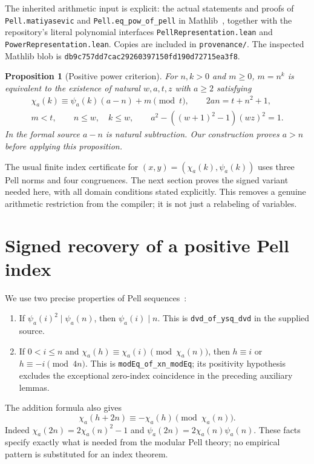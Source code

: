 \documentclass[11pt]{article}
\newtheorem{proposition}[theorem]{Proposition}
\theoremstyle{definition}
\theoremstyle{remark}
\newcommand{\File}[1]{\nolinkurl{#1}}
\begin{document}
The inherited arithmetic input is explicit: the actual statements and
proofs of \File{Pell.matiyasevic} and \File{Pell.eq_pow_of_pell} in
Mathlib~\cite{pell}, together with the repository's literal polynomial
interfaces \File{PellRepresentation.lean} and
\File{PowerRepresentation.lean}. Copies are included in
\File{provenance/}. The inspected Mathlib blob is
\texttt{db9c757dd7cac29260397150fd190d72715ea3f8}.

\begin{proposition}[Positive power criterion]\label{prop:power}
For $n,k>0$ and $m\ge0$, $m=n^k$ is equivalent to the existence of natural
$w,a,t,z$ with $a\ge2$ satisfying
\begin{gather*}
 \chi_a(k)\equiv\psi_a(k)(a-n)+m\pmod t,\qquad
 2an=t+n^2+1,\\
 m<t,\qquad n\le w,\quad k\le w,\qquad
 a^2-((w+1)^2-1)(wz)^2=1.
\end{gather*}
In the formal source $a-n$ is natural subtraction. Our construction proves
$a>n$ before applying this proposition.
\end{proposition}

The usual finite index certificate for
$(x,y)=(\chi_a(k),\psi_a(k))$ uses three Pell norms and four congruences.
The next section proves the signed variant needed here, with all domain
conditions stated explicitly. This removes a genuine arithmetic
restriction from the compiler; it is not just a relabeling of variables.

\section{Signed recovery of a positive Pell index}\label{sec:signed}

We use two precise properties of Pell sequences~\cite{pell}:
\begin{enumerate}
\item If $\psi_a(i)^2\mid\psi_a(n)$, then $\psi_a(i)\mid n$.
This is \File{dvd_of_ysq_dvd} in the supplied source.
\item If $0<i\le n$ and
$\chi_a(h)\equiv\chi_a(i)\pmod{\chi_a(n)}$, then
$h\equiv i$ or $h\equiv-i\pmod{4n}$.
This is \File{modEq_of_xn_modEq}; its positivity hypothesis excludes
the exceptional zero-index coincidence in the preceding auxiliary lemmas.
\end{enumerate}
The addition formula also gives
\begin{equation}\label{eq:signshift}
 \chi_a(h+2n)\equiv-\chi_a(h)\pmod{\chi_a(n)}.
\end{equation}
Indeed $\chi_a(2n)=2\chi_a(n)^2-1$ and
$\psi_a(2n)=2\chi_a(n)\psi_a(n)$. These facts specify exactly what is
needed from the modular Pell theory; no empirical pattern is substituted
for an index theorem.
\end{document}
